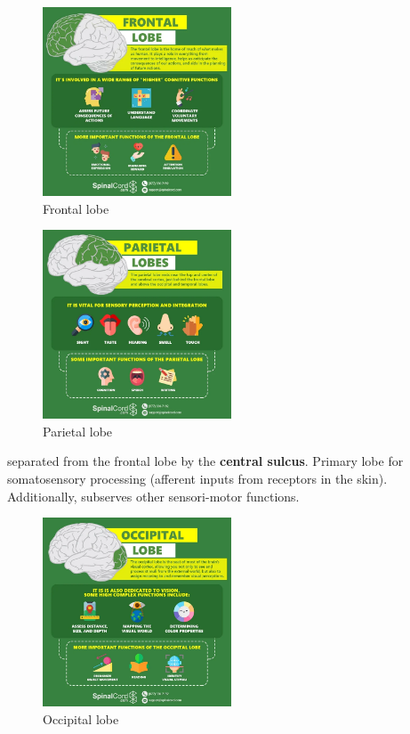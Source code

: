 \documentclass{article}
\begin{document}
    \begin{figure}[H]
    \centering
    \includegraphics[width=0.5\textwidth]{assets/frontalLobe.png}
    \caption{Frontal lobe}
    \end{figure}
    
    \begin{figure}[H]
    \centering
    \includegraphics[width=0.5\textwidth]{assets/parietalLobe.png}
    \caption{Parietal lobe}
    \end{figure}
    
    \noindent separated from the frontal lobe by the \textbf{central sulcus}. Primary lobe for somatosensory processing (afferent inputs from receptors in the skin). Additionally, subserves other sensori-motor functions.
    
    \begin{figure}[H]
    \centering
    \includegraphics[width=0.5\textwidth]{assets/occipitalLobe.png}
    \caption{Occipital lobe}
    \end{figure}
    
\end{document}
